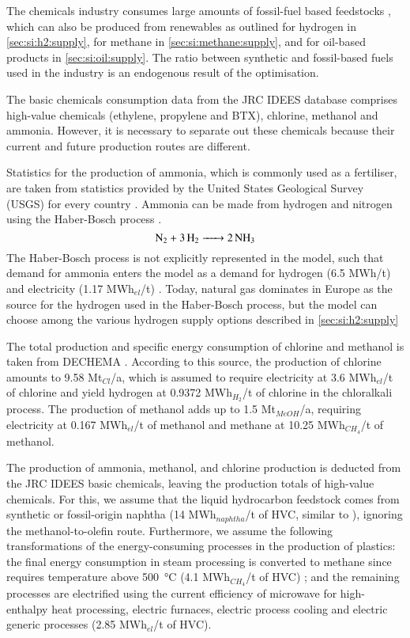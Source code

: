 The chemicals industry consumes large amounts of fossil-fuel based feedstocks
, which can also be produced from renewables as
outlined for hydrogen in \cref{sec:si:h2:supply}, for methane in
\cref{sec:si:methane:supply}, and for oil-based products in
\cref{sec:si:oil:supply}. The ratio between synthetic and fossil-based fuels
used in the industry is an endogenous result of the optimisation.

The basic chemicals consumption data from the JRC IDEES  database
comprises high-value chemicals (ethylene, propylene and BTX), chlorine, methanol
and ammonia. However, it is necessary to separate out these chemicals because
their current and future production routes are different.

Statistics for the production of ammonia, which is commonly used as a
fertiliser, are taken from statistics provided by the United States Geological
Survey (USGS) for every country \citeS{}. Ammonia can be made from hydrogen and
nitrogen using the Haber-Bosch process .
\begin{equation}
    \ce{N2 + 3H2 -> 2NH3}
\end{equation}
The Haber-Bosch process is not explicitly represented in the model, such that
demand for ammonia enters the model as a demand for hydrogen (6.5
MWh/t) and electricity (1.17 MWh$_{el}$/t)
. Today, natural gas dominates in Europe as the source for
the hydrogen used in the Haber-Bosch process, but the model can choose among the
various hydrogen supply options described in
\cref{sec:si:h2:supply}

The total production and specific energy consumption of chlorine and methanol is
taken from DECHEMA . According to this
source, the production of chlorine amounts to 9.58 Mt$_{Cl}$/a, which is assumed
to require electricity at 3.6 MWh$_{el}$/t of chlorine and yield hydrogen at
0.9372 MWh$_{H_2}$/t of chlorine in the chloralkali process. The production of
methanol adds up to 1.5 Mt$_{MeOH}$/a, requiring electricity at 0.167 MWh$_{el}$/t
of methanol and methane at 10.25 MWh$_{CH_4}$/t of methanol.

The production of ammonia, methanol, and chlorine production is deducted from
the JRC IDEES basic chemicals, leaving the production totals of high-value
chemicals. For this, we assume that the liquid hydrocarbon feedstock comes from
synthetic or fossil-origin naphtha (14 MWh$_{naphtha}$/t of HVC, similar to
), ignoring the methanol-to-olefin
route. Furthermore, we assume the following transformations of the
energy-consuming processes in the production of plastics: the final energy
consumption in steam processing is converted to methane since requires
temperature above \SI{500}{\celsius} (4.1 MWh$_{CH_4}$/t of HVC)
; and the remaining processes are
electrified using the current efficiency of microwave for high-enthalpy heat
processing, electric furnaces, electric process cooling and electric generic
processes (2.85 MWh$_{el}$/t of HVC).


